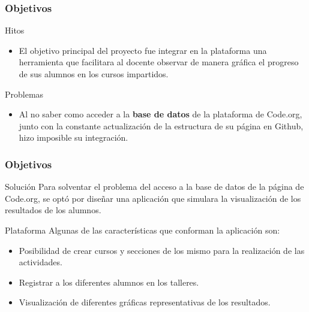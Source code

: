 \documentclass{beamer}
\begin{document}
\begin{frame}

\frametitle{Objetivos }

\begin{block}{Hitos}
  \begin{itemize}
  \item
   El objetivo principal del proyecto fue integrar en la plataforma una herramienta que facilitara al docente observar de manera gráfica el progreso de sus alumnos
   en los cursos impartidos.

  \end{itemize}
\end{block}

\begin{alertblock}{Problemas}
    \begin{itemize}
        \item Al no saber como acceder a la \textbf{base de datos} de la plataforma de Code.org, junto con la constante actualización de la estructura de su página en Github, hizo imposible su integración.
    \end{itemize}
\end{alertblock}

\end{frame}
\begin{frame}

\frametitle{Objetivos }

\begin{exampleblock}{Solución}
    Para solventar el problema del acceso a la base de datos de la página de Code.org, se optó por diseñar una aplicación que simulara la visualización de los resultados
    de los alumnos.
\end{exampleblock}

\begin{block}{Plataforma}
    Algunas de las características que conforman la aplicación son:
    \begin{itemize}
        \item Posibilidad de crear cursos y secciones de los mismo para la realización de las actividades.
        \item Registrar a los diferentes alumnos en los talleres.
        \item Visualización de diferentes gráficas representativas de los resultados.
    \end{itemize}
\end{block}

\end{frame}
\end{document}
